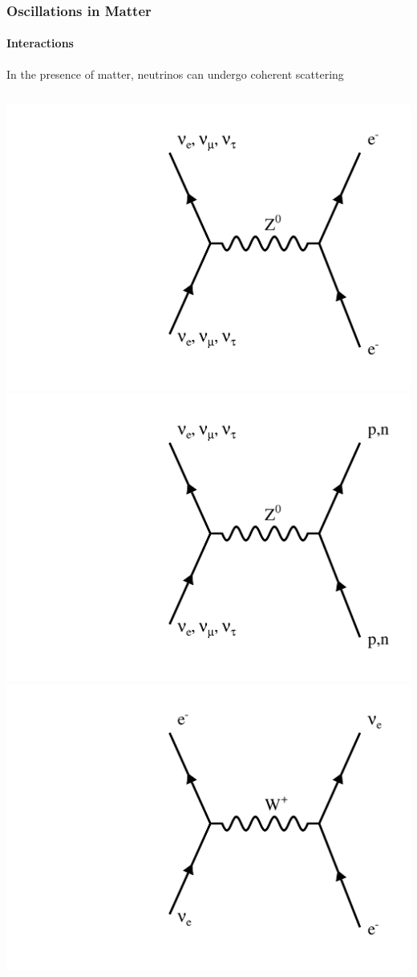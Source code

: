 \documentclass[10pt,professionalfonts,xcolor=table]{beamer}
\begin{document}
\frame
{
  \frametitle{Oscillations in Matter}
  \framesubtitle{Interactions}
  \begin{itemize}
  \bang In the presence of matter, neutrinos can undergo coherent scattering
  \begin{columns}[c]
    \centering
    \includegraphics[width=\textwidth, angle=-90]{figures/feynman/ncElec.pdf}
      \centering
      \includegraphics[width=\textwidth, angle=-90]{figures/feynman/ncHad.pdf}
      \centering
      \includegraphics[width=\textwidth, angle=-90]{figures/feynman/ccElec.pdf}


\end{columns}
\end{itemize}}
\end{document}
